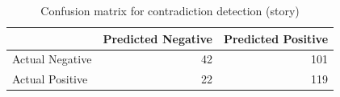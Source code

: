 \begin{table}
\caption{Confusion matrix for contradiction detection (story)}
\label{tab:confusion_matrix}
\begin{tabular}{lrr}
\toprule
 & Predicted Negative & Predicted Positive \\
\midrule
Actual Negative & 42 & 101 \\
Actual Positive & 22 & 119 \\
\bottomrule
\end{tabular}
\end{table}
